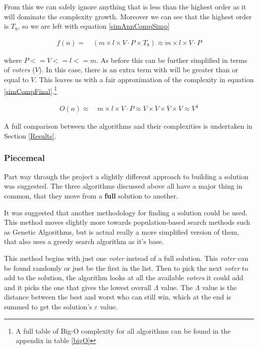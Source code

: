 \documentclass[12pt]{report}
\begin{document}
From this we can safely ignore anything that is less than the highest order as it will dominate the complexity growth. Moreover we can see that the highest order is $T_8$, so we are left with equation \ref{simAnnCompSimp}

\begin{equation}\label{simAnnCompSimp}
\begin{aligned}
	f(n) ={} & \ (m \times l \times V \cdot P \times T_8) \approx m \times l \times V \cdot P
\end{aligned}
\end{equation}

where $P <= V <= l <= m$. As before this can be further simplified in terms of \textit{voters} ($V$). In this case, there is an extra term with will be greater than or equal to $V$. This leaves us with a fair approximation of the complexity in equation \ref{simCompFinal}.\footnote{A full table of Big-O complexity for all algorithms can be found in the appendix in table \ref{bigO}}

\begin{equation}\label{simCompFinal}
\begin{aligned}
	O(n) \approx{} & \ m \times l \times V \cdot P \approx V \times V \times V \times V \approx V^4
\end{aligned}
\end{equation}

A full comparison between the algorithms and their complexities is undertaken in Section \ref{Results}.


\subsubsection{Piecemeal}
Part way through the project a slightly different approach to building a solution was suggested. The three algorithms discussed above all have a major thing in common, that they move from a \textbf{full} solution to another.

It was suggested that another methodology for finding a solution could be used. This method moves slightly more towards population-based search methods such as Genetic Algorithms, but is actual really a more simplified version of them, that also uses a greedy search algorithm as it's base. 

This method begins with just one \textit{voter} instead of a full solution. This \textit{voter} can be found randomly or just be the first in the list. Then to pick the next \textit{voter} to add to the solution, the algorithm looks at all the available \textit{voters} it could add and it picks the one that gives the lowest overall $\Lambda$ value. The $\Lambda$ value is the distance between the best and worst who can still win, which at the end is summed to get the solution's $\varepsilon$ value.
\end{document}
